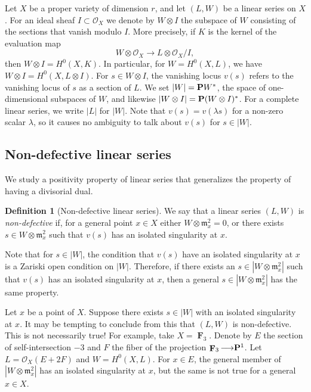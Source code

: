 \documentclass[11pt,reqno]{amsart}
\theoremstyle{plain}
\theoremstyle{definition}
\newtheorem{definition}[theorem]{Definition}
\theoremstyle{remark}
\numberwithin{equation}{section}
\DeclareMathOperator{\F}{\mathbf F}
\renewcommand{\to}{{\longrightarrow}}
\numberwithin{equation}{section}
\renewcommand{\O}{\mathcal O}
\begin{document}
Let $X$ be a proper variety of dimension $r$, and let $(L, W)$ be a linear series on $X$.
For an ideal sheaf $I \subset \O_X$ we denote by $W \otimes I$ the subspace of $W$ consisting of the sections that vanish modulo $I$. %
More precisely, if $K$ is the kernel of the evaluation map
\[ W \otimes \O_X \to L \otimes \O_X/I,\]
then $W \otimes I = H^0(X, K)$.
In particular, for $W = H^0(X, L)$, we have $W \otimes I = H^0(X, L \otimes I)$.
For $s \in W \otimes I$, the vanishing locus $v(s)$ refers to the vanishing locus of $s$ as a section of $L$.
We set $|W| = \P W^*$, the space of one-dimensional subspaces of $W$, and likewise $|W \otimes I| = \P (W \otimes I)^*$.
For a complete linear series, we write $|L|$ for $|W|$.
Note that $v(s) = v(\lambda s)$ for a non-zero scalar $\lambda$, so it causes no ambiguity to talk about $v(s)$ for $s \in |W|$.

\subsection{Non-defective linear series}\label{sec:non-defectivity}
We study a positivity property of linear series that generalizes the property of having a divisorial dual.
\begin{definition}[Non-defective linear series]
  \label{def:genericallynon-defective} 
  We say that a linear series $(L, W)$ is \emph{non-defective} if,  for a general point $x \in X$ either $W \otimes \mathfrak m_x^2 = 0$, or there exists $s \in W \otimes \mathfrak m_x^2$ such that $v(s)$ has an isolated singularity at $x$.
\end{definition}
Note that for $s \in |W|$, the condition that $v(s)$ have an isolated singularity at $x$ is a Zariski open condition on $|W|$.
Therefore, if there exists an $s \in |W \otimes \mathfrak m_x^2|$ such that $v(s)$ has an isolated singularity at $x$, then a general $s \in |W \otimes \mathfrak m_x^2|$ has the same property.
\begin{remark}
  Let $x$ be a point of $X$.
  Suppose there exists $s \in |W|$ with an isolated singularity at $x$.
  It may be tempting to conclude from this that $(L, W)$ is non-defective.
  This is not necessarily true!
  For example, take $X = \F_3$.
  Denote by $E$ the section of self-intersection $-3$ and $F$ the fiber of the projection $\F_3 \to \P^1$.
  Let $L = \O_X(E + 2F)$ and $W = H^0(X, L)$.
  For $x \in E$, the general member of $|W \otimes \mathfrak m_x^2|$ has an isolated singularity at $x$, but the same is not true for a general $x \in X$.
\end{remark}
\end{document}
